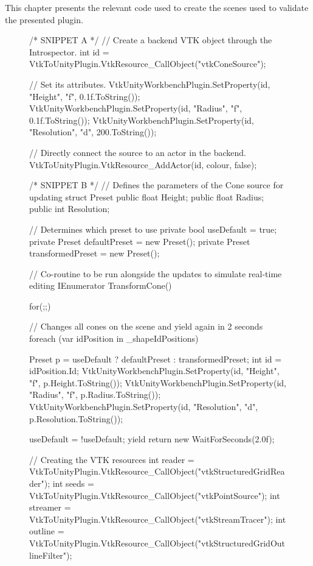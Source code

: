 \begin{appendices}
This chapter presents the relevant code used to create the scenes used to validate the presented plugin.

\begin{figure}[ht!]
    \centering
    \begin{cs}[label=lst:ConeTestVtkInst,caption={C\# calls to create a VTK cone source in Unity (Snippet a) and to update it through a co-routine (Snippet b)}]
/* SNIPPET A */
// Create a backend VTK object through the Introspector.
int id = VtkToUnityPlugin.VtkResource_CallObject("vtkConeSource");

// Set its attributes.
VtkUnityWorkbenchPlugin.SetProperty(id, "Height", "f", 0.1f.ToString());
VtkUnityWorkbenchPlugin.SetProperty(id, "Radius", "f", 0.1f.ToString());
VtkUnityWorkbenchPlugin.SetProperty(id, "Resolution", "d", 200.ToString());

// Directly connect the source to an actor in the backend.
VtkToUnityPlugin.VtkResource_AddActor(id, colour, false);

/* SNIPPET B */
// Defines the parameters of the Cone source for updating
struct Preset
{
    public float Height;
    public float Radius;
    public int Resolution;
}

// Determines which preset to use
private bool useDefault = true;
private Preset defaultPreset = new Preset();
private Preset transformedPreset = new Preset();

// Co-routine to be run alongside the updates to simulate real-time editing
IEnumerator TransformCone()
{
    for(;;)
    {
        // Changes all cones on the scene and yield again in 2 seconds
        foreach (var idPosition in _shapeIdPositions)
        {
            Preset p = useDefault ? defaultPreset : transformedPreset;
            int id = idPosition.Id;
            VtkUnityWorkbenchPlugin.SetProperty(id, "Height", "f", p.Height.ToString());
            VtkUnityWorkbenchPlugin.SetProperty(id, "Radius", "f", p.Radius.ToString());
            VtkUnityWorkbenchPlugin.SetProperty(id, "Resolution", "d", p.Resolution.ToString());

        }
        useDefault = !useDefault;
        yield return new WaitForSeconds(2.0f);
    }
}
    \end{cs}
\end{figure}

\begin{figure}[ht!]
    \centering
    \begin{cs}[label=lst:StremTracerVtkInst,caption={C\# calls to create a VTK stream tracer in Unity.}]
// Creating the VTK resources
int reader = VtkToUnityPlugin.VtkResource_CallObject("vtkStructuredGridReader");
int seeds = VtkToUnityPlugin.VtkResource_CallObject("vtkPointSource");
int streamer = VtkToUnityPlugin.VtkResource_CallObject("vtkStreamTracer");
int outline = VtkToUnityPlugin.VtkResource_CallObject("vtkStructuredGridOutlineFilter");


\end{cs}
\end{figure}
\end{appendices}
